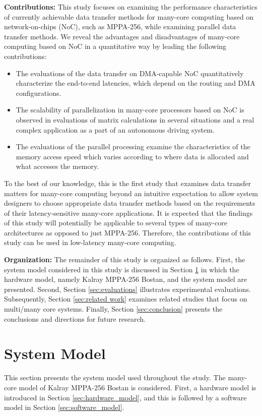 \documentclass{sig-alternate-05-2015}
\begin{document}
\textbf{Contributions:}
This study focuses on examining the performance characteristics of currently achievable data transfer methods for many-core computing based on network-on-chips (NoC), such as MPPA-256, while examining parallel data transfer methods.
We reveal the advantages and disadvantages of many-core computing based on NoC in a quantitative way by leading the following contributions:
\begin{itemize}
\item The evaluations of the data transfer on DMA-capable NoC quantitatively characterize the end-to-end latencies, which depend on the routing and DMA configurations.
\item The scalability of parallelization in many-core processors based on NoC is observed in evaluations of matrix calculations in several situations and a real complex application as a part of an autonomous driving system.
\item The evaluations of the parallel processing examine the characteristics of the memory access speed which varies according to where data is allocated and what accesses the memory.
\end{itemize}

To the best of our knowledge, this is the first study that examines data transfer matters for many-core computing beyond an intuitive expectation to allow system designers to choose appropriate data transfer methods based on the requirements of their latency-sensitive many-core applications.
It is expected that the findings of this study will potentially be applicable to several types of many-core architectures as opposed to just MPPA-256.
Therefore, the contributions of this study can be used in low-latency many-core computing.

\textbf{Organization:}
The remainder of this study is organized as follows.
First, the system model considered in this study is discussed in Section \ref{sec:system_model} in which the hardware model, namely Kalray MPPA-256 Bostan, and the system model are presented.
Second, Section \ref{sec:evaluations} illustrates experimental evaluations.
Subsequently, Section \ref{sec:related work} examines related studies that focus on multi/many core systems.
Finally, Section \ref{sec:conclusion} presents the conclusions and directions for future research.


\section{System Model}
\label{sec:system_model}
This section presents the system model used throughout the study.
The many-core model of Kalray MPPA-256 Bostan is considered.
First, a hardware model is introduced in Section \ref{sec:hardware_model}, and this is followed by a software model in Section \ref{sec:software_model}.
\end{document}
